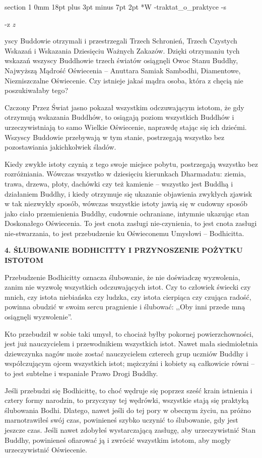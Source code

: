 \documentclass[12pt]{article}
\makeatletter
\renewcommand{\section}{\@startsection%
 {section}			%
 {1}				%
 {0mm}				%
 {18pt plus 3pt minus 7pt}	%
 { 2pt}				%
 {\bfseries}}			%
\newcounter{labelnum}
\newenvironment{Prayer}[4]{%
	\section*{#2}
	\ifx -#1
		\stepcounter{labelnum}\label{label.\arabic{labelnum}}\nopagebreak
	\else
		\label{#1}\nopagebreak
	\fi
	\ifx -#3
		\addcontentsline{toc}{section}{#2}
	\else
		\addcontentsline{toc}{section}{#3}
	\fi
	\ifx -#4
		{}
	\else
		\noindent\emph{#4}\par\nopagebreak
	\fi
	\begingroup
}
{\par\endgroup}
\makeatother
\begin{document}
\begin{Prayer}{traktat_o_praktyce}
Wszyscy Buddowie otrzymali i przestrzegali Trzech Schronień, Trzech Czystych Wskazań i Wskazania Dziesięciu Ważnych Zakazów. Dzięki otrzymaniu tych wskazań wszyscy Buddhowie trzech światów osiągnęli Owoc Stanu Buddhy, Najwyższą Mądrość Oświecenia -- Anuttara Samiak Sambodhi, Diamentowe, Niezniszczalne Oświecenie. Czy istnieje jakaś mądra osoba, która z chęcią nie poszukiwałaby tego?


Czczony Przez Świat jasno pokazał wszystkim odczuwającym istotom, że gdy otrzymują wskazania Buddhów, to osiągają poziom wszystkich Buddhów i urzeczywistniają to samo Wielkie Oświecenie, naprawdę stając się ich dziećmi. Wszyscy Buddowie przebywają w tym stanie, postrzegają wszystko bez pozostawiania jakichkolwiek śladów. 


Kiedy zwykłe istoty czynią z tego swoje miejsce pobytu, postrzegają wszystko bez rozróżniania. Wówczas wszystko w dziesięciu kierunkach Dharmadatu: ziemia, trawa, drzewa, płoty, dachówki czy też kamienie -- wszystko jest Buddhą i działaniem Buddhy, i kiedy otrzymuje się ukazanie objawienia zwykłych zjawisk w tak niezwykły sposób, wówczas wszystkie istoty jawią się w cudowny sposób jako ciało przemienienia Buddhy, cudownie ochraniane, intymnie ukazując stan Doskonałego Oświecenia. To jest cnota zasługi nie-czynienia, to jest cnota zasługi nie-stwarzania, to jest przebudzenie ku Oświeconemu Umysłowi -- Bodhicitta.


\bigskip
\noindent\textbf{4. ŚLUBOWANIE BODHICITTY I PRZYNOSZENIE POŻYTKU ISTOTOM}\par
\medskip


Przebudzenie Bodhicitty oznacza ślubowanie, że nie doświadczę wyzwolenia, zanim nie wyzwolę wszystkich odczuwających istot.  Czy to człowiek świecki czy mnich, czy istota niebiańska czy ludzka, czy istota cierpiąca czy czująca radość, powinna obudzić w swoim sercu pragnienie i ślubować: ,,Oby inni przede mną osiągnęli wyzwolenie''.


Kto przebudził w sobie taki umysł, to chociaż byłby pokornej powierzchowności, jest już nauczycielem i przewodnikiem wszystkich istot. Nawet mała siedmioletnia dziewczynka nagów może zostać nauczycielem czterech grup uczniów Buddhy i współczującym ojcem wszystkich istot; mężczyźni i kobiety są całkowicie równi -- to jest  subtelne i wspaniałe Prawo Drogi Buddhy. 


Jeśli przebudzi się Bodhicittę, to choć wędruje się poprzez sześć krain istnienia i cztery formy narodzin, to przyczyny tej wędrówki, wszystkie stają się praktyką ślubowania Bodhi. Dlatego, nawet jeśli do tej pory w obecnym życiu, na próżno marnotrawiłeś swój czas, powinieneś szybko uczynić to ślubowanie, gdy jest jeszcze czas. Jeśli nawet zdobyłeś wystarczającą zasługę, aby urzeczywistnić Stan Buddhy, powinieneś ofiarować ją i zwrócić wszystkim istotom, aby mogły urzeczywistnić Oświecenie. 



\end{Prayer}
\end{document}
